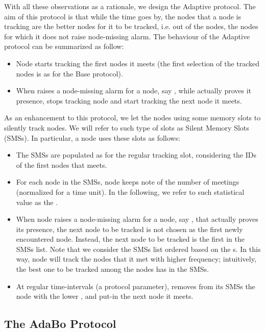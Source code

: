 \documentclass{IEEEconf}
\begin{document}
With all these observations as a rationale, we design the Adaptive protocol. The aim of this protocol is that while the time goes by, the  nodes that a node is tracking are the  better nodes for it to be tracked, i.e. out of the  nodes, the  nodes for which it does not raise node-missing alarm.
The behaviour of the Adaptive protocol can be summarized as follow:
\begin{itemize}
\item Node  starts tracking the first  nodes it meets (the first selection of the tracked nodes is as for the Base protocol).
\item When  raises a node-missing alarm for a node, say , while  actually proves it presence,  stops tracking node  and start tracking the next node it meets.
\end{itemize}
As an enhancement to this protocol, we let the nodes using some memory slots to silently track nodes. We will refer to such type of slots as Silent Memory Slots (SMSs). In particular, a node  uses these slots as follows:
\begin{itemize}
\item The SMSs are populated as for the regular tracking slot, considering the IDs of the first nodes that  meets.
\item For each node in the SMSs, node  keeps note of the number of meetings (normalized for a time unit). In the following, we refer to such statistical value as the .
\item When node  raises a node-missing alarm for a node, say , that actually proves its presence, the next node to be tracked is not chosen as the first newly encountered node. Instead, the next node to be tracked is the first in the SMSs list. Note that we consider the SMSs list ordered based on the s. In this way, node  will track the nodes that it met with higher frequency; intuitively, the best one to be tracked among the nodes    has in the SMSs.
\item At regular time-intervals (a protocol parameter),  removes from its SMSs the node with the lower , and put-in the next node it meets.
\end{itemize}








\subsection{The AdaBo Protocol}
\label{caching}
\end{document}
